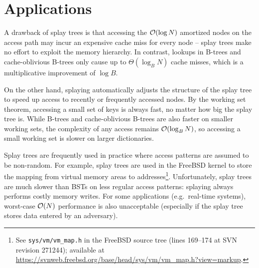 \section{Applications}
A drawback of splay trees is that accessing the $\mathcal{O}(\log N)$ amortized
nodes on the access path may incur an expensive cache miss for every node --
splay trees make no effort to exploit the memory hierarchy.
In contrast, lookups in B-trees and cache-oblivious B-trees
only cause up to $\Theta(\log_B N)$ cache misses, which is a multiplicative
improvement of $\log B$.

On the other hand, splaying automatically adjusts the structure of the splay
tree to speed up access to recently or frequently accessed nodes. By the
working set theorem, accessing a small set of keys is always fast, no matter
how big the splay tree is. While B-trees and cache-oblivious B-trees are
also faster on smaller working sets, the complexity of any access remains
$\mathcal{O}(\log_B N)$, so accessing a small working set is slower on larger
dictionaries.

Splay trees are frequently used in practice where access patterns are assumed
to be non-random. For example, splay trees are used in the FreeBSD kernel
to store the mapping from virtual memory areas to
addresses\footnote{%
	See \texttt{sys/vm/vm\_map.h} in the FreeBSD source tree (lines 169--174
	at SVN revision 271244); available at
	\url{https://svnweb.freebsd.org/base/head/sys/vm/vm\_map.h?view=markup}.
}.
Unfortunately, splay trees are much slower than BSTs on less
regular access patterns: splaying always performs costly memory writes.
For some applications (e.g.\ real-time systems), worst-case $\mathcal{O}(N)$ performance
is also unacceptable (especially if the splay tree stores data entered by
an adversary).
